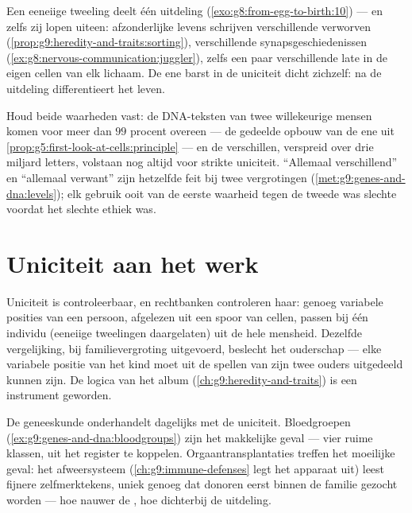 \begin{example}\label{ex:g9:unique-individuals:twins}
Een eeneiige tweeling deelt één uitdeling
(\cref{exo:g8:from-egg-to-birth:10}) --- en zelfs zij lopen
uiteen: afzonderlijke levens schrijven verschillende verworven
 (\cref{prop:g9:heredity-and-traits:sorting}),
verschillende synapsgeschiedenissen
(\cref{ex:g8:nervous-communication:juggler}), zelfs een paar
verschillende late  in de eigen cellen van elk lichaam.
De ene barst in de uniciteit dicht zichzelf: na de uitdeling
differentieert het leven.
\end{example}

\begin{remark}\label{rem:g9:unique-individuals:alike}
Houd beide waarheden vast: de DNA-teksten van twee willekeurige
mensen komen voor meer dan $99$ procent overeen --- de gedeelde
opbouw van de ene  uit
\cref{prop:g5:first-look-at-cells:principle} --- en de
verschillen, verspreid over drie miljard letters, volstaan nog
altijd voor strikte uniciteit. ``Allemaal verschillend'' en
``allemaal verwant'' zijn hetzelfde feit bij twee vergrotingen
(\cref{met:g9:genes-and-dna:levels}); elk gebruik ooit van de
eerste waarheid tegen de tweede was slechte  voordat het
slechte ethiek was.
\end{remark}

\section{Uniciteit aan het werk}

\begin{example}\label{ex:g9:unique-individuals:forensics}
Uniciteit is controleerbaar, en rechtbanken controleren haar:
genoeg variabele posities van een persoon, afgelezen uit een
spoor van cellen, passen bij één individu (eeneiige tweelingen
daargelaten) uit de hele mensheid. Dezelfde vergelijking, bij
familievergroting uitgevoerd, beslecht het ouderschap --- elke
variabele positie van het kind moet uit de spellen van zijn twee
ouders uitgedeeld kunnen zijn. De logica van het album
(\cref{ch:g9:heredity-and-traits}) is een instrument geworden.
\end{example}

\begin{example}\label{ex:g9:unique-individuals:medicine}
De geneeskunde onderhandelt dagelijks met de uniciteit.
Bloedgroepen (\cref{ex:g9:genes-and-dna:bloodgroups}) zijn het
makkelijke geval --- vier ruime klassen, uit het register te
koppelen. Orgaantransplantaties treffen het moeilijke geval: het
afweersysteem (\cref{ch:g9:immune-defenses} legt het apparaat
uit) leest fijnere zelfmerktekens, uniek genoeg dat donoren
eerst binnen de familie gezocht worden --- hoe nauwer de
, hoe dichterbij de uitdeling.
\end{example}

